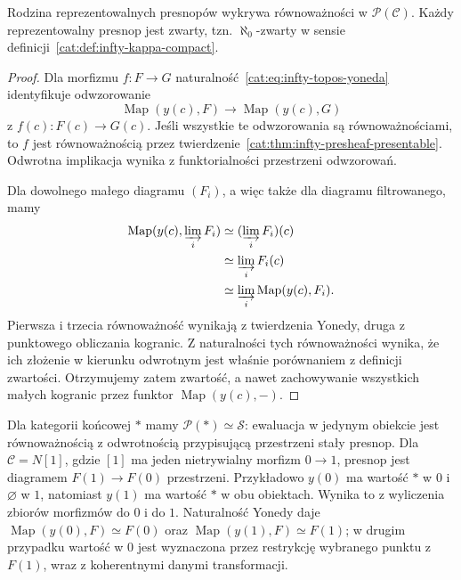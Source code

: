 \begin{stwierdzenie}\label{cat:prop:infty-presheaf-generators}
Rodzina reprezentowalnych presnopów wykrywa równoważności w $\mathcal P(\mathcal C)$. Każdy reprezentowalny presnop jest zwarty, tzn. $\aleph_0$-zwarty w sensie definicji~\ref{cat:def:infty-kappa-compact}.
\end{stwierdzenie}
\begin{proof}
Dla morfizmu $f:F\to G$ naturalność~\eqref{cat:eq:infty-topos-yoneda} identyfikuje odwzorowanie
\[
 \operatorname{Map}(y(c),F)\longrightarrow\operatorname{Map}(y(c),G)
\]
z $f(c):F(c)\to G(c)$. Jeśli wszystkie te odwzorowania są równoważnościami, to $f$ jest równoważnością przez twierdzenie~\ref{cat:thm:infty-presheaf-presentable}. Odwrotna implikacja wynika z funktorialności przestrzeni odwzorowań.

Dla dowolnego małego diagramu $(F_i)$, a więc także dla diagramu filtrowanego, mamy
\[
\begin{aligned}
 \operatorname{Map}(y(c),\varinjlim_i F_i)
 &\simeq(\varinjlim_i F_i)(c)\\
 &\simeq\varinjlim_i F_i(c)\\
 &\simeq\varinjlim_i\operatorname{Map}(y(c),F_i).
\end{aligned}
\]
Pierwsza i trzecia równoważność wynikają z twierdzenia Yonedy, druga z punktowego obliczania kogranic. Z naturalności tych równoważności wynika, że ich złożenie w kierunku odwrotnym jest właśnie porównaniem z definicji zwartości. Otrzymujemy zatem zwartość, a nawet zachowywanie wszystkich małych kogranic przez funktor $\operatorname{Map}(y(c),-)$.
\end{proof}

\begin{przyklad}\label{cat:ex:infty-presheaf-simple}
Dla kategorii końcowej $*$ mamy $\mathcal P(*)\simeq\mathcal S$: ewaluacja w jedynym obiekcie jest równoważnością z odwrotnością przypisującą przestrzeni stały presnop. Dla $\mathcal C=N[1]$, gdzie $[1]$ ma jeden nietrywialny morfizm $0\to1$, presnop jest diagramem $F(1)\to F(0)$ przestrzeni. Przykładowo $y(0)$ ma wartość $*$ w $0$ i $\varnothing$ w $1$, natomiast $y(1)$ ma wartość $*$ w obu obiektach. Wynika to z wyliczenia zbiorów morfizmów do $0$ i do $1$. Naturalność Yonedy daje $\operatorname{Map}(y(0),F)\simeq F(0)$ oraz $\operatorname{Map}(y(1),F)\simeq F(1)$; w drugim przypadku wartość w $0$ jest wyznaczona przez restrykcję wybranego punktu z $F(1)$, wraz z koherentnymi danymi transformacji.
\end{przyklad}

